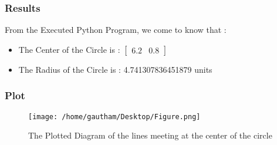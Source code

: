 \documentclass{beamer}
\begin{document}
\begin{frame}
\frametitle{Results}
From the Executed Python Program, we come to know that :
\begin{itemize}
\item<1->The Center of the Circle is : $\begin{bmatrix} 6.2 & 0.8
\end{bmatrix}$
\item<2-> The Radius of the Circle is : 4.741307836451879 units
\end{itemize}\textsl{}
\end{frame}

\begin{frame}
\frametitle{Plot}
\begin{figure}[h]
\centering
\texttt{[image: /home/gautham/Desktop/Figure.png]}
\caption{The Plotted Diagram of the lines meeting at the center of the circle}
\label{foobar-figure}
\end{figure}

\end{frame}
\end{document}

